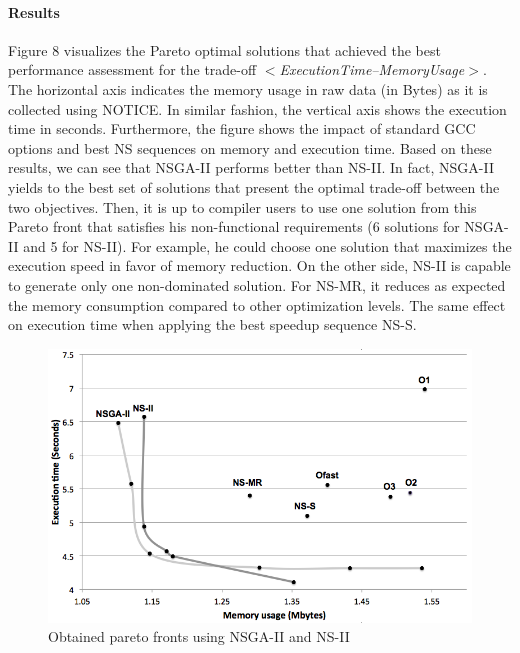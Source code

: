 \paragraph{Results}
Figure 8 visualizes the Pareto optimal solutions that achieved the best performance assessment for the trade-off \textit{$<$ExecutionTime--MemoryUsage$>$}. The horizontal axis indicates the memory usage in raw data (in Bytes) as it is collected using NOTICE. In similar fashion, the vertical axis shows the execution time in seconds. Furthermore, the figure shows the impact of standard GCC options and best NS sequences on memory and execution time. Based on these results, we can see that NSGA-II performs better than NS-II. In fact, NSGA-II yields to the best set of solutions that present the optimal trade-off between the two objectives. Then, it is up to compiler users to use one solution from this Pareto front that satisfies his non-functional requirements (6 solutions for NSGA-II and 5 for NS-II). For example, he could choose one solution that maximizes the execution speed in favor of memory reduction. On the other side, NS-II is capable to generate only one non-dominated solution. For NS-MR, it reduces as expected the memory consumption compared to other optimization levels. The same effect on execution time when applying the best speedup sequence NS-S.
 


\begin{figure}[h]
	\centering
	\includegraphics[width=1.\linewidth]{Ressources/pareto.png}
	\caption{Obtained pareto fronts using NSGA-II and NS-II}
\end{figure}


\noindent{}
